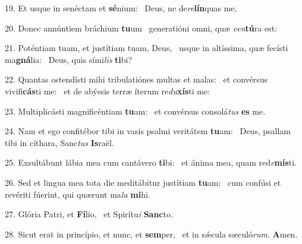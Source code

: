 19. Et usque in senéctam et \textbf{sé}nium: \ast\  Deus, ne de\textit{re}\textbf{lín}quas me,\

20. Donec annúntiem bráchium \textbf{tu}um \ast\  generatióni omni, quæ \textit{ven}\textbf{tú}ra est:\

21. Poténtiam tuam, et justítiam tuam, Deus, \dag\  usque in altíssima, quæ fecísti ma\textbf{gná}lia: \ast\  Deus, quis sími\textit{lis} \textbf{ti}bi?\

22. Quantas ostendísti mihi tribulatiónes multas et malas: \dag\  et convérsus vivifi\textbf{cás}ti me: \ast\  et de abýssis terræ íterum re\textit{du}\textbf{xís}ti me:\

23. Multiplicásti magnificéntiam \textbf{tu}am: \ast\  et convérsus consolá\textit{tus} \textbf{es} me.\

24. Nam et ego confitébor tibi in vasis psalmi veritátem \textbf{tu}am: \ast\  Deus, psallam tibi in cíthara, Sanc\textit{tus} \textbf{Is}raël.\

25. Exsultábunt lábia mea cum cantávero \textbf{ti}bi: \ast\  et ánima mea, quam red\textit{e}\textbf{mís}ti.\

26. Sed et lingua mea tota die meditábitur justítiam \textbf{tu}am: \ast\  cum confúsi et revériti fúerint, qui quærunt ma\textit{la} \textbf{mi}hi.\

27. Glória Patri, et \textbf{Fí}lio, \ast\  et Spirítu\textit{i} \textbf{Sanc}to.\

28. Sicut erat in princípio, et nunc, et \textbf{sem}per, \ast\  et in sǽcula sæculó\textit{rum}. \textbf{A}men.\

